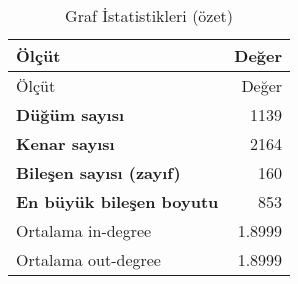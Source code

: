 \begin{longtable}{l r}
\caption{Graf İstatistikleri (özet)}\\
\toprule
Ölçüt & Değer \\
\midrule
\endfirsthead
\toprule
Ölçüt & Değer \\
\midrule
\endhead
\bottomrule
\endfoot
\bottomrule
\endlastfoot
\textbf{Düğüm sayısı} & 1139 \\
\textbf{Kenar sayısı} & 2164 \\
\textbf{Bileşen sayısı (zayıf)} & 160 \\
\textbf{En büyük bileşen boyutu} & 853 \\
Ortalama in-degree & 1.8999 \\
Ortalama out-degree & 1.8999 \\
\end{longtable}

